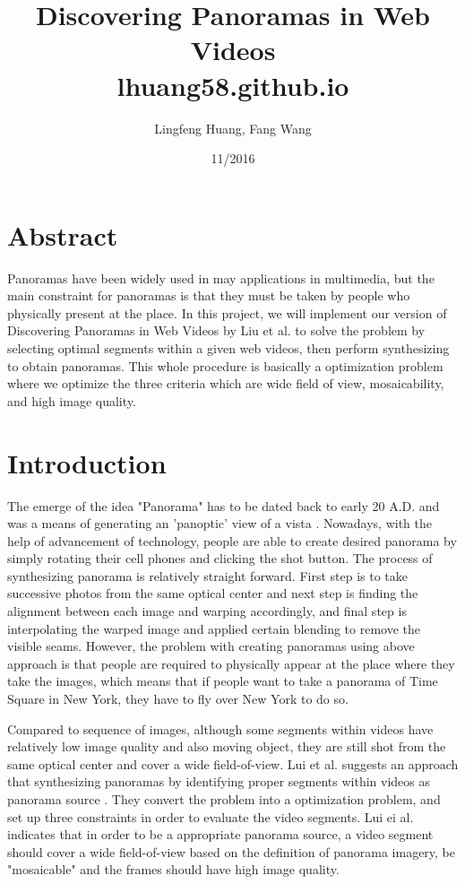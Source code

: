 \documentclass[12pt]{article}
\title{Discovering Panoramas in Web Videos \\ lhuang58.github.io}
\author{Lingfeng Huang, Fang Wang}
\date{11/2016}
\begin{document}
\maketitle

\section*{Abstract}
Panoramas have been widely used in may applications in multimedia, but the main constraint for panoramas is that they must be
taken by people who physically present at the place. In this project, we will implement our version of Discovering Panoramas in Web Videos by Liu et al. 
to solve the problem by selecting optimal segments within a given web videos, then perform synthesizing to obtain panoramas. This 
whole procedure is basically a optimization problem where we optimize the three criteria which are wide field of view, mosaicability, and high image 
quality.
\section{Introduction}
The emerge of the idea "Panorama" has to be dated back to early 20 A.D. and was a means of generating an 'panoptic' view of a vista \cite{wikipedia}. Nowadays, 
with the help of advancement of technology, people are able to create desired panorama by simply rotating their cell phones and clicking the shot button. The process
of synthesizing panorama is relatively straight forward. First step is to take successive photos from the same optical center and next step is finding the alignment between
each image and warping accordingly, and final step is interpolating the warped image and applied certain blending to remove the visible seams. However, the problem with creating
panoramas using above approach is that people are required to physically appear at the place where they take the images, which means that if people want to take a panorama
of Time Square in New York, they have to fly over New York to do so. \par
Compared to sequence of images, although some segments within videos have relatively low image quality and also moving object, they are still shot from the same optical center and cover a wide field-of-view. Lui et al. suggests an approach that synthesizing panoramas by identifying proper segments within videos as panorama source \cite{Lui}. They convert the problem into a optimization problem, and set up three constraints in order to evaluate the video segments. Lui ei al. indicates that in order to be a appropriate panorama source, a video segment should cover a wide field-of-view based on the definition of panorama imagery,  be "mosaicable" and the frames should have high image quality\cite{Lui}.
\end{document}
